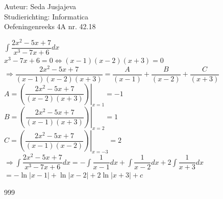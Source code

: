 \documentclass[a4paper]{article}
\newcommand{\integral}{\displaystyle\int}
\begin{document}
\noindent \large Auteur: Seda Jusjajeva\\
\noindent \large Studierichting: Informatica\\
\noindent \large Oefeningenreeks 4A nr. 42.18\\

\medskip

\normalsize

$\integral\dfrac{2x^2 - 5x + 7}{x^3 - 7x + 6}dx$ \\

$x^3 - 7x + 6 = 0 \Leftrightarrow (x - 1)(x - 2)(x + 3) = 0$ \\

$\Rightarrow\dfrac{2x^2 - 5x + 7}{(x - 1)(x - 2)(x + 3)} = \dfrac{A}{(x - 1)} + \dfrac{B}{(x - 2)} + \dfrac{C}{(x + 3)}$ \\

$A = \left.\left(\dfrac{2x^2 - 5x + 7}{(x - 2)(x + 3)}\right)\right|_{x = 1} = -1 $ \\

$B = \left.\left(\dfrac{2x^2 - 5x + 7}{(x - 1)(x + 3)}\right)\right|_{x = 2} = 1 $ \\

$C = \left.\left(\dfrac{2x^2 - 5x + 7}{(x - 1)(x - 2)}\right)\right|_{x = -3} = 2 $ \\

$\Rightarrow \integral\dfrac{2x^2 - 5x + 7}{x^3 - 7x + 6}dx = -\integral\dfrac{1}{x - 1}dx + \integral\dfrac{1}{x - 2}dx + 2\integral\dfrac{1}{x + 3}dx$ \\

$= -\ln|x-1| + \ln|x-2| + 2\ln|x+3| + c$



\begin{thebibliography}{999}
\end{thebibliography}
\end{document}
